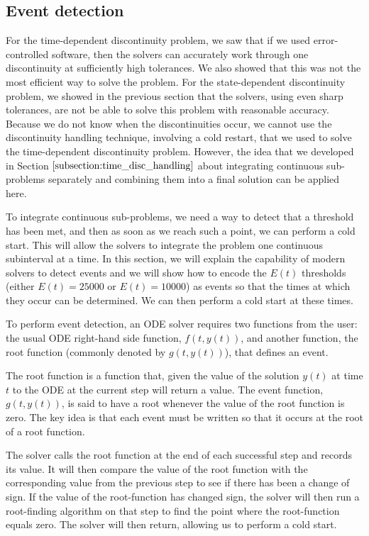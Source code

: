 \subsection{Event detection}
\label{subsection:intro_event_detection}
For the time-dependent discontinuity problem, we saw that if we used error-controlled software, then the solvers can accurately work through one discontinuity at sufficiently high tolerances. We also showed that this was not the most efficient way to solve the problem. For the state-dependent discontinuity problem, we showed in the previous section that the solvers, using even sharp tolerances, are not be able to solve this problem with reasonable accuracy. Because we do not know when the discontinuities occur, we cannot use the discontinuity handling technique, involving a cold restart, that we used to solve the time-dependent discontinuity problem. However, the idea that we developed in Section $\ref{subsection:time_disc_handling}$ about integrating continuous sub-problems separately and combining them into a final solution can be applied here. 

To integrate continuous sub-problems, we need a way to detect that a threshold has been met, and then as soon as we reach such a point, we can perform a cold start. This will allow the solvers to integrate the problem one continuous subinterval at a time. In this section, we will explain the capability of modern solvers to detect events and we will show how to encode the $E(t)$ thresholds (either $E(t)=25000$ or $E(t)=10000$) as events so that the times at which they occur can be determined. We can then perform a cold start at these times.

To perform event detection, an ODE solver requires two functions from the user: the usual ODE right-hand side function, $f(t, y(t))$, and another function, the root function (commonly denoted by $g(t, y(t))$), that defines an event.

The root function is a function that, given the value of the solution $y(t)$ at time $t$ to the ODE at the current step will return a value. The event function, $g(t, y(t))$, is said to have a root whenever the value of the root function is zero. The key idea is that each event must be written so that it occurs at the root of a root function.

The solver calls the root function at the end of each successful step and records its value. It will then compare the value of the root function with the corresponding value from the previous step to see if there has been a change of sign. If the value of the root-function has changed sign, the solver will then run a root-finding algorithm on that step to find the point where the root-function equals zero. The solver will then return, allowing us to perform a cold start.

